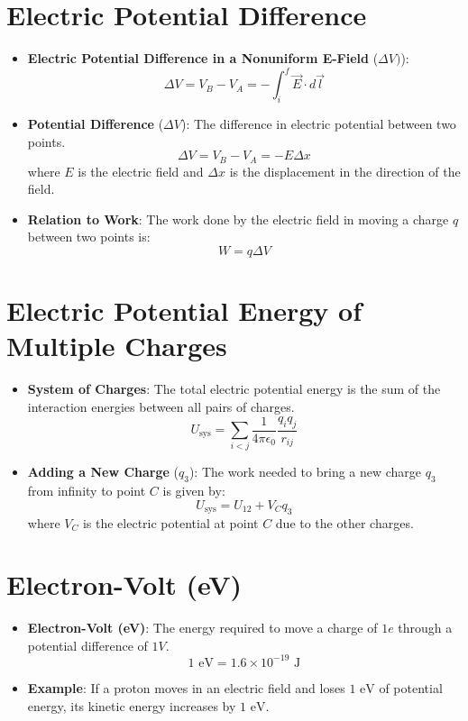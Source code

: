 \documentclass{article}
\begin{document}
\section*{Electric Potential Difference}
\begin{itemize}
    \item \textbf{Electric Potential Difference in a Nonuniform E-Field} (\(\Delta V)\)):
    \[
        \Delta V = V_B - V_A = -\int_i^f \vec{E} \cdot d\vec{l}
    \]
    \item \textbf{Potential Difference} (\(\Delta V\)): The difference in electric potential between two points.
    \[
    \Delta V = V_B - V_A = -E \Delta x
    \]
    where \(E\) is the electric field and \(\Delta x\) is the displacement in the direction of the field.
    \item \textbf{Relation to Work}: The work done by the electric field in moving a charge \(q\) between two points is:
    \[
    W = q \Delta V
    \]
\end{itemize}

\section*{Electric Potential Energy of Multiple Charges}
\begin{itemize}
    \item \textbf{System of Charges}: The total electric potential energy is the sum of the interaction energies between all pairs of charges.
    \[
    U_{\text{sys}} = \sum_{i<j} \frac{1}{4 \pi \epsilon_0} \frac{q_i q_j}{r_{ij}}
    \]
    \item \textbf{Adding a New Charge} (\(q_3\)): The work needed to bring a new charge \(q_3\) from infinity to point \(C\) is given by:
    \[
    U_{\text{sys}} = U_{12} + V_C q_3
    \]
    where \(V_C\) is the electric potential at point \(C\) due to the other charges.
\end{itemize}

\section*{Electron-Volt (eV)}
\begin{itemize}
    \item \textbf{Electron-Volt (eV)}: The energy required to move a charge of \(1e\) through a potential difference of \(1V\).
    \[
    1 \text{ eV} = 1.6 \times 10^{-19} \text{ J}
    \]
    \item \textbf{Example}: If a proton moves in an electric field and loses \(1 \text{ eV}\) of potential energy, its kinetic energy increases by \(1 \text{ eV}\).
\end{itemize}
\end{document}
